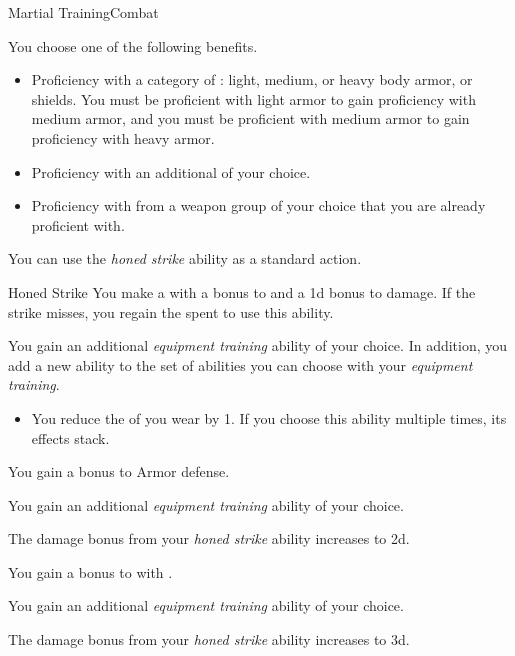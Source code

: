     \begin{feat}{Martial Training}{Combat}

         You choose one of the following benefits.
        \begin{itemize}
            \item Proficiency with a category of : light, medium, or heavy body armor, or shields.
                You must be proficient with light armor to gain proficiency with medium armor, and you must be proficient with medium armor to gain proficiency with heavy armor.
            \item Proficiency with an additional  of your choice.
            \item Proficiency with  from a weapon group of your choice that you are already proficient with.
        \end{itemize}

         You can use the \textit{honed strike} ability as a standard action.
        \begin{apability}{Honed Strike}
            You make a  with a  bonus to  and a \plus1d bonus to damage.
            If the strike misses, you regain the  spent to use this ability.
        \end{apability}

         You gain an additional \textit{equipment training} ability of your choice.
        In addition, you add a new ability to the set of abilities you can choose with your \textit{equipment training}.
        \begin{itemize}
            \item You reduce the  of  you wear by 1.
                If you choose this ability multiple times, its effects stack.
        \end{itemize}

         You gain a  bonus to Armor defense.

         You gain an additional \textit{equipment training} ability of your choice.

         The damage bonus from your \textit{honed strike} ability increases to \plus2d.

         You gain a  bonus to  with .

         You gain an additional \textit{equipment training} ability of your choice.

         The damage bonus from your \textit{honed strike} ability increases to \plus3d.
    \end{feat}

